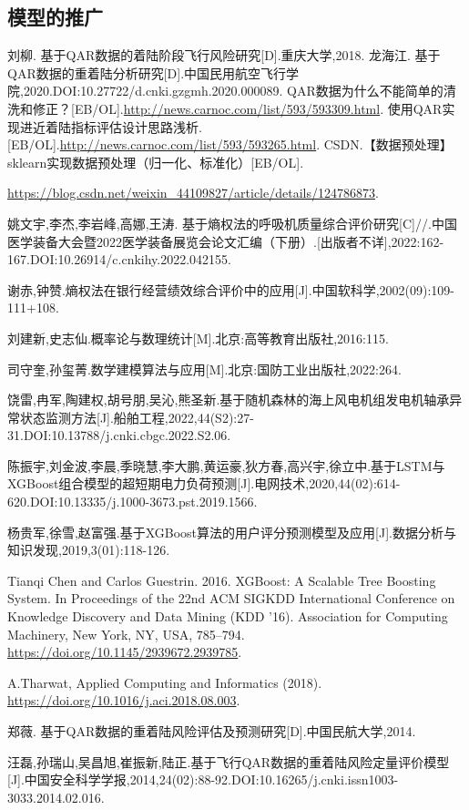 \documentclass{MathModeling}
\begin{document}
	\subsection{模型的推广}
	
	\newpage
	\begin{spacing}{1.08}
	\begin{thebibliography}{99}
	刘柳. 基于QAR数据的着陆阶段飞行风险研究[D].重庆大学,2018.
	龙海江. 基于QAR数据的重着陆分析研究[D].中国民用航空飞行学院,2020.DOI:10.27722/d.cnki.gzgmh.2020.000089.
	QAR数据为什么不能简单的清洗和修正？[EB/OL].\url{http://news.carnoc.com/list/593/593309.html}.
	使用QAR实现进近着陆指标评估设计思路浅析.[EB/OL].\url{http://news.carnoc.com/list/593/593265.html}.
	CSDN.【数据预处理】sklearn实现数据预处理（归一化、标准化）[EB/OL].
	
	\url{https://blog.csdn.net/weixin_44109827/article/details/124786873}.

	姚文宇,李杰,李岩峰,高娜,王涛. 基于熵权法的呼吸机质量综合评价研究[C]//.中国医学装备大会暨2022医学装备展览会论文汇编（下册）.[出版者不详],2022:162-167.DOI:10.26914/c.cnkihy.2022.042155.

	谢赤,钟赞.熵权法在银行经营绩效综合评价中的应用[J].中国软科学,2002(09):109-111+108.

	刘建新,史志仙.概率论与数理统计[M].北京:高等教育出版社,2016:115.

	司守奎,孙玺菁.数学建模算法与应用[M].北京:国防工业出版社,2022:264.

	饶雷,冉军,陶建权,胡号朋,吴沁,熊圣新.基于随机森林的海上风电机组发电机轴承异常状态监测方法[J].船舶工程,2022,44(S2):27-31.DOI:10.13788/j.cnki.cbgc.2022.S2.06.

	陈振宇,刘金波,李晨,季晓慧,李大鹏,黄运豪,狄方春,高兴宇,徐立中.基于LSTM与XGBoost组合模型的超短期电力负荷预测[J].电网技术,2020,44(02):614-620.DOI:10.13335/j.1000-3673.pst.2019.1566.

	杨贵军,徐雪,赵富强.基于XGBoost算法的用户评分预测模型及应用[J].数据分析与知识发现,2019,3(01):118-126.

	Tianqi Chen and Carlos Guestrin. 2016. XGBoost: A Scalable Tree Boosting System. In Proceedings of the 22nd ACM SIGKDD International Conference on Knowledge Discovery and Data Mining (KDD '16). Association for Computing Machinery, New York, NY, USA, 785–794. \url{https://doi.org/10.1145/2939672.2939785}.

	A.Tharwat, Applied Computing and Informatics (2018). \url{https://doi.org/10.1016/j.aci.2018.08.003}.

	郑薇. 基于QAR数据的重着陆风险评估及预测研究[D].中国民航大学,2014.

	汪磊,孙瑞山,吴昌旭,崔振新,陆正.基于飞行QAR数据的重着陆风险定量评价模型[J].中国安全科学学报,2014,24(02):88-92.DOI:10.16265/j.cnki.issn1003-3033.2014.02.016.
	\end{thebibliography}
	\end{spacing}
\end{document}
